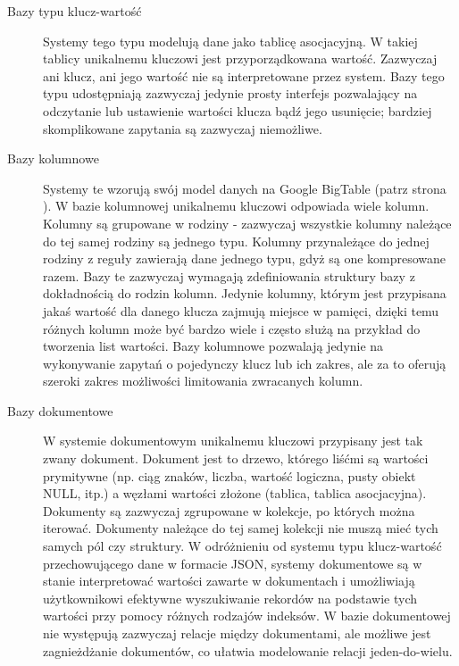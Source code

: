 \begin{description}
 \item[Bazy typu klucz-wartość]
 Systemy tego typu modelują dane jako tablicę asocjacyjną.
 W takiej tablicy unikalnemu kluczowi jest przyporządkowana wartość.
 Zazwyczaj ani klucz, ani jego wartość nie są interpretowane przez system.
 Bazy tego typu udostępniają zazwyczaj jedynie prosty interfejs pozwalający na odczytanie lub ustawienie wartości klucza bądź jego usunięcie; bardziej skomplikowane zapytania są zazwyczaj niemożliwe.
 
 \item[Bazy kolumnowe]
 Systemy te wzorują swój model danych na Google BigTable (patrz strona \pageref{google-bigtable-model-danych}).
 W bazie kolumnowej unikalnemu kluczowi odpowiada wiele kolumn.
 Kolumny są grupowane w rodziny - zazwyczaj wszystkie kolumny należące do tej samej rodziny są jednego typu.
 Kolumny przynależące do jednej rodziny z reguły zawierają dane jednego typu, gdyż są one kompresowane razem.
 Bazy te zazwyczaj wymagają zdefiniowania struktury bazy z dokładnością do rodzin kolumn.
 Jedynie kolumny, którym jest przypisana jakaś wartość dla danego klucza zajmują miejsce w pamięci, dzięki temu różnych kolumn może być bardzo wiele i często służą na przykład do tworzenia list wartości.
 Bazy kolumnowe pozwalają jedynie na wykonywanie zapytań o pojedynczy klucz lub ich zakres, ale za to oferują szeroki zakres możliwości limitowania zwracanych kolumn.

 \item[Bazy dokumentowe]
 W systemie dokumentowym unikalnemu kluczowi przypisany jest tak zwany dokument.
 Dokument jest to drzewo, którego liśćmi są wartości prymitywne (np. ciąg znaków, liczba, wartość logiczna, pusty obiekt NULL, itp.) a węzłami wartości złożone (tablica, tablica asocjacyjna).
 Dokumenty są zazwyczaj zgrupowane w kolekcje, po których można iterować.
 Dokumenty należące do tej samej kolekcji nie muszą mieć tych samych pól czy struktury.
 W odróżnieniu od systemu typu klucz-wartość przechowującego dane w formacie JSON, systemy dokumentowe są w stanie interpretować wartości zawarte w dokumentach i umożliwiają użytkownikowi efektywne wyszukiwanie rekordów na podstawie tych wartości przy pomocy różnych rodzajów indeksów.
 W bazie dokumentowej nie występują zazwyczaj relacje między dokumentami, ale możliwe jest zagnieżdżanie dokumentów, co ułatwia modelowanie relacji jeden-do-wielu.
 

\end{description}
